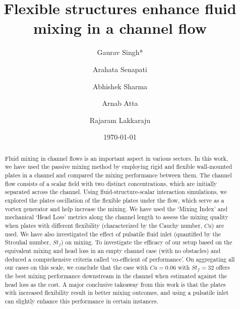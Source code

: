 \documentclass[%
 aip,
 amsmath,amssymb,
 reprint,
]{revtex4-1}
\begin{document}

\title[]{Flexible structures enhance fluid mixing in a channel flow}
\author{Gaurav Singh*}
  
\author{Arahata Senapati}%

\author{Abhishek Sharma}
\author{Arnab Atta}
	\author{Rajaram Lakkaraju}

\date{\today}%

\begin{abstract}
Fluid mixing in channel flows is an important aspect in various sectors. In this work, we have used the passive mixing method by employing rigid and flexible wall-mounted plates in a channel and compared the mixing performance between them. The channel flow consists of a scalar field with two distinct concentrations, which are initially separated across the channel. Using fluid-structure-scalar interaction simulations, we explored the plates oscillation of the flexible plates under the flow, which serve as a vortex generator and help increase the mixing. We have used the `Mixing Index' and mechanical `Head Loss' metrics along the channel length to assess the mixing quality when plates with different flexibility (characterized by the Cauchy number, $Ca$) are used. We have also investigated the effect of pulsatile fluid inlet (quantified by the Strouhal number, $St_f$) on mixing. To investigate the efficacy of our setup based on the equivalent mixing and head loss in an empty channel case (with no obstacles) and deduced a comprehensive criteria called `co-efficient of performance'. On aggregating all our cases on this scale, we conclude that the case with $Ca=0.06$ with $St_f=32$ offers the best mixing performance downstream in the channel when estimated against the head loss as the cost. A major conclusive takeaway from this work is that the plates with increased flexibility result in better mixing outcomes, and using a pulsatile inlet can slightly enhance this performance in certain instances. 
\end{abstract}
\end{document}
